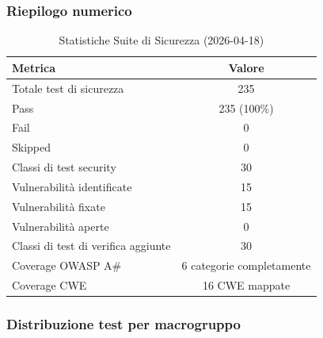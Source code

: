 \documentclass[12pt, a4paper]{article}
\begin{document}
    \subsubsection{Riepilogo numerico}

    \begin{table}[H]
        \centering
        \begin{tabular}{|l|c|}
            \hline
            \textbf{Metrica} & \textbf{Valore} \\
            \hline
            Totale test di sicurezza & 235 \\
            Pass & 235 (100\%) \\
            Fail & 0 \\
            Skipped & 0 \\
            \hline
            Classi di test security & 30 \\
            \hline
            Vulnerabilità identificate & 15 \\
            Vulnerabilità fixate & 15 \\
            Vulnerabilità aperte & 0 \\
            Classi di test di verifica aggiunte & 30 \\
            \hline
            Coverage OWASP A\# & 6 categorie completamente \\
            Coverage CWE & 16 CWE mappate \\
            \hline
        \end{tabular}
        \caption{Statistiche Suite di Sicurezza (2026-04-18)}
        \label{tab:security_stats}
    \end{table}

    \subsubsection{Distribuzione test per macrogruppo}
\end{document}
